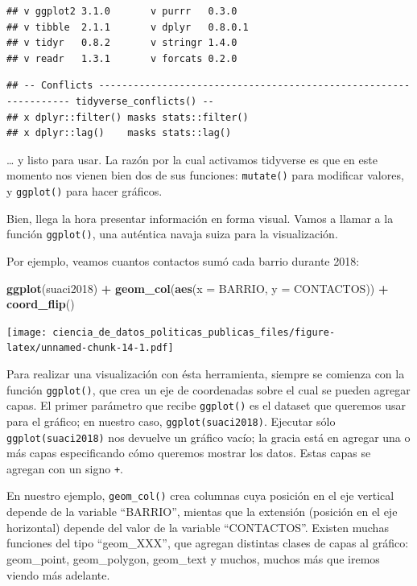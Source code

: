 \documentclass[]{book}
\newenvironment{Shaded}{\begin{snugshade}}{\end{snugshade}}
\newcommand{\KeywordTok}[1]{\textcolor[rgb]{0.13,0.29,0.53}{\textbf{#1}}}
\newcommand{\DataTypeTok}[1]{\textcolor[rgb]{0.13,0.29,0.53}{#1}}
\newcommand{\StringTok}[1]{\textcolor[rgb]{0.31,0.60,0.02}{#1}}
\newcommand{\OperatorTok}[1]{\textcolor[rgb]{0.81,0.36,0.00}{\textbf{#1}}}
\newcommand{\NormalTok}[1]{#1}
\begin{document}
\begin{verbatim}
## v ggplot2 3.1.0       v purrr   0.3.0  
## v tibble  2.1.1       v dplyr   0.8.0.1
## v tidyr   0.8.2       v stringr 1.4.0  
## v readr   1.3.1       v forcats 0.2.0
\end{verbatim}

\begin{verbatim}
## -- Conflicts ----------------------------------------------------------------- tidyverse_conflicts() --
## x dplyr::filter() masks stats::filter()
## x dplyr::lag()    masks stats::lag()
\end{verbatim}

\ldots{} y listo para usar. La razón por la cual activamos tidyverse es
que en este momento nos vienen bien dos de sus funciones:
\texttt{mutate()} para modificar valores, y \texttt{ggplot()} para hacer
gráficos.

Bien, llega la hora presentar información en forma visual. Vamos a
llamar a la función \texttt{ggplot()}, una auténtica navaja suiza para
la visualización.

Por ejemplo, veamos cuantos contactos sumó cada barrio durante 2018:

\begin{Shaded}
\begin{Highlighting}[]
\KeywordTok{ggplot}\NormalTok{(suaci2018) }\OperatorTok{+}
\StringTok{    }\KeywordTok{geom_col}\NormalTok{(}\KeywordTok{aes}\NormalTok{(}\DataTypeTok{x =}\NormalTok{ BARRIO, }\DataTypeTok{y =}\NormalTok{ CONTACTOS)) }\OperatorTok{+}
\StringTok{    }\KeywordTok{coord_flip}\NormalTok{()}
\end{Highlighting}
\end{Shaded}

\texttt{[image: ciencia\_de\_datos\_politicas\_publicas\_files/figure-latex/unnamed-chunk-14-1.pdf]}

Para realizar una visualización con ésta herramienta, siempre se
comienza con la función \texttt{ggplot()}, que crea un eje de
coordenadas sobre el cual se pueden agregar capas. El primer parámetro
que recibe \texttt{ggplot()} es el dataset que queremos usar para el
gráfico; en nuestro caso, \texttt{ggplot(suaci2018)}. Ejecutar sólo
\texttt{ggplot(suaci2018)} nos devuelve un gráfico vacío; la gracia está
en agregar una o más capas especificando cómo queremos mostrar los
datos. Estas capas se agregan con un signo \texttt{+}.

En nuestro ejemplo, \texttt{geom\_col()} crea columnas cuya posición en
el eje vertical depende de la variable ``BARRIO'', mientas que la
extensión (posición en el eje horizontal) depende del valor de la
variable ``CONTACTOS''. Existen muchas funciones del tipo ``geom\_XXX'',
que agregan distintas clases de capas al gráfico: geom\_point,
geom\_polygon, geom\_text y muchos, muchos más que iremos viendo más
adelante.
\end{document}
